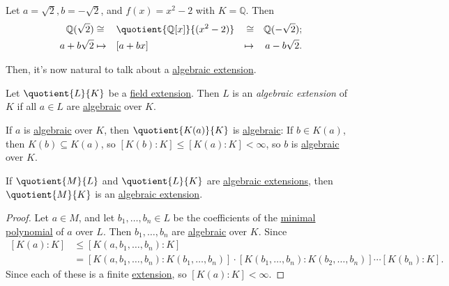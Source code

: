 \begin{eg}
	Let \(a=\sqrt{2}, b=-\sqrt{2} \), and \(f(x) = x^2 - 2\) with \(K=\mathbb{Q} \). Then
	\[
		\begin{aligned}
			\mathbb{Q} (\sqrt{2} ) & \cong   &  & \quotient{\mathbb{Q} [x]}{(x^2 - 2)} & \cong   &  & \mathbb{Q} (-\sqrt{2} ); \\
			a+b\sqrt{2}            & \mapsto &  & [a+bx]                               & \mapsto &  & a-b\sqrt{2}.
		\end{aligned}
	\]
\end{eg}

Then, it's now natural to talk about a \hyperref[def:algebraic-extension]{algebraic extension}.

\begin{definition}\label{def:algebraic-extension}
	Let \(\quotient{L}{K} \) be a \hyperref[def:field-extension]{field extension}. Then \(L\) is an \emph{algebraic extension} of \(K\) if all \(a\in L\) are \hyperref[def:algebraic]{algebraic} over \(K\).
\end{definition}

If \(a\) is \hyperref[def:algebraic]{algebraic} over \(K\), then \(\quotient{K(a)}{K} \) is \hyperref[def:algebraic-extension]{algebraic}: If \(b\in K(a)\), then \(K(b) \subseteq K(a)\), so \([K(b) \colon K] \leq [K(a) \colon K] < \infty \), so \(b\) is \hyperref[def:algebraic]{algebraic} over \(K\).

\begin{theorem}
	If \(\quotient{M}{L} \) and \(\quotient{L}{K} \) are \hyperref[def:algebraic-extension]{algebraic extensions}, then \(\quotient{M}{K} \) is an \hyperref[def:algebraic-extension]{algebraic extension}.
\end{theorem}
\begin{proof}
	Let \(a\in M\), and let \(b_1, \ldots , b_n\in L\) be the coefficients of the \hyperref[def:minimal-polynomial]{minimal polynomial} of \(a\) over \(L\). Then \(b_1, \ldots , b_n\) are \hyperref[def:algebraic]{algebraic} over \(K\). Since
	\[
		\begin{split}
			[K(a) \colon K]
			&\leq [K(a, b_1, \ldots , b_n) \colon K]\\
			&= [K(a, b_1, \ldots , b_n) \colon K(b_1, \ldots , b_n)] \cdot [K(b_1, \ldots , b_n) \colon K(b_2, \ldots , b_n)] \cdots [K(b_n) \colon K].
		\end{split}
	\]
	Since each of these is a finite \hyperref[def:field-extension]{extension}, so \([K(a) \colon K] < \infty \).
\end{proof}

